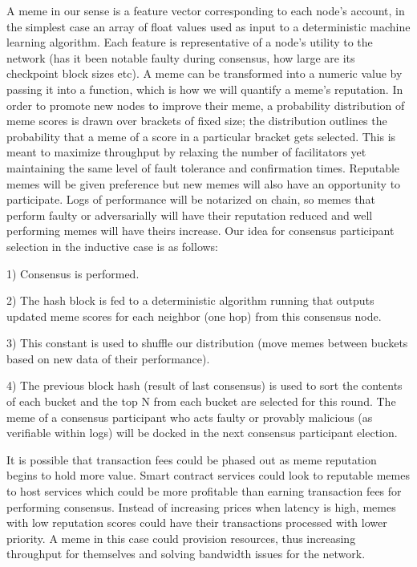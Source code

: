 \documentclass{article}
\begin{document}
A meme in our sense is a feature vector corresponding to each node's account, in the simplest case an array of float values used as input to a deterministic machine learning algorithm. Each feature is representative of a node's utility to the network (has it been notable faulty during consensus, how large are its checkpoint block sizes etc). A meme can be transformed into a numeric value by passing it into a function, which is how we will quantify a meme's reputation. In order to promote new nodes to improve their meme, a probability distribution of meme scores is drawn over brackets of fixed size; the distribution outlines the probability that a meme of a score in a particular bracket gets selected. This is meant to maximize throughput by relaxing the number of facilitators yet maintaining the same level of fault tolerance and confirmation times. Reputable memes will be given preference but new memes will also have an opportunity to participate. Logs of performance will be notarized on chain, so memes that perform faulty or adversarially will have their reputation reduced and well performing memes will have theirs increase. Our idea for consensus participant selection in the inductive case is as follows:

1) Consensus is performed. 

2) The hash block is fed to a deterministic algorithm running that outputs updated meme scores for each neighbor (one hop) from this consensus node. 

3) This constant is used to shuffle our distribution (move memes between buckets based on new data of their performance). 

4) The previous block hash (result of last consensus) is used to sort the contents of each bucket and the top N from each bucket are selected for this round. The meme of a consensus participant who acts faulty or provably malicious (as verifiable within logs) will be docked in the next consensus participant election.

It is possible that transaction fees could be phased out as meme reputation begins to hold more value. Smart contract services could look to reputable memes to host services which could be more profitable than earning transaction fees for performing consensus. Instead of increasing prices when latency is high, memes with low reputation scores could have their transactions processed with lower priority. A meme in this case could provision resources, thus increasing throughput for themselves and solving bandwidth issues for the network. 
\end{document}
